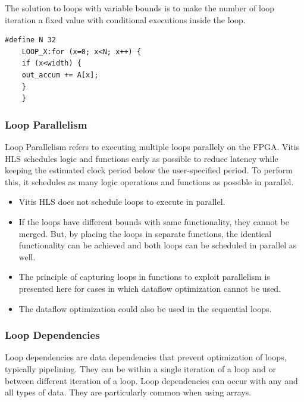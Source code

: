 The solution to loops with variable bounds is to make the number of loop iteration a fixed value with conditional executions inside the loop. \eg

\begin{lstlisting}[style=CStyle]
    #define N 32
    LOOP_X:for (x=0; x<N; x++) {
    if (x<width) {
    out_accum += A[x];
    }
    }
\end{lstlisting}

\subsubsection{Loop Parallelism}
Loop Parallelism refers to executing multiple loops parallely on the FPGA. Vitis HLS schedules logic and functions early as possible to reduce latency while keeping the estimated clock period below the user-specified period. To perform this, it schedules as many logic operations and functions as possible in parallel. 

\begin{itemize}
  \item Vitis HLS does not schedule loops to execute in parallel.
  \item If the loops have different bounds with same functionality, they cannot be merged. But, by placing the loops in separate functions, the identical functionality can be achieved and both loops can be scheduled in parallel as well.
  \item The principle of capturing loops in functions to exploit parallelism is presented here for cases in which dataflow optimization cannot be used.
  \item The dataflow optimization could also be used in the sequential loops.
\end{itemize}

\subsubsection{Loop Dependencies}
Loop dependencies are data dependencies that prevent optimization of loops, typically pipelining. They can be within a single iteration of a loop and or between different iteration of a loop. Loop dependencies can occur with any and all types of data. They are particularly common when
using arrays.


